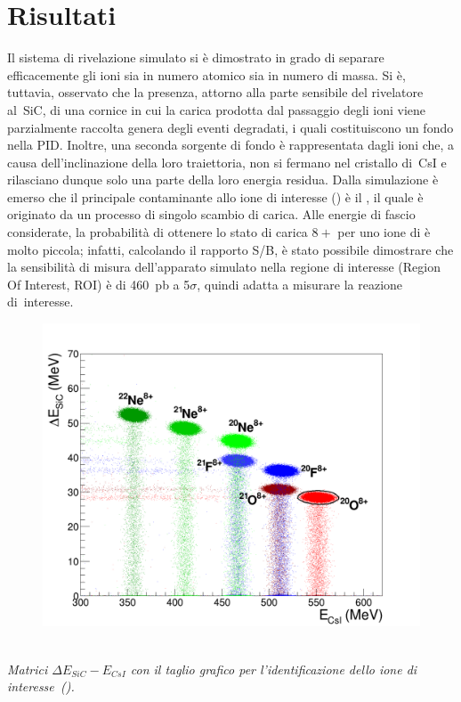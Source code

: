\documentclass[10pt,foldmark,notumble]{leaflet}
\begin{document}
\section{Risultati}

Il sistema di rivelazione simulato si è dimostrato in grado di separare efficacemente gli ioni sia in numero atomico sia in numero di massa.
Si è, tuttavia, osservato che la presenza, attorno alla parte sensibile del rivelatore al~SiC, di una cornice in cui la carica prodotta dal passaggio degli ioni viene parzialmente raccolta genera degli eventi degradati, i quali costituiscono un fondo nella PID.
Inoltre, una seconda sorgente di fondo è rappresentata dagli ioni che, a causa dell'inclinazione della loro traiettoria, non si fermano nel cristallo di~CsI e rilasciano dunque solo una parte della loro energia residua.
Dalla simulazione è emerso che il principale contaminante allo ione di interesse () è il , il quale è originato da un processo di singolo scambio di carica.
Alle energie di fascio considerate, la probabilità di ottenere lo stato di carica $8+$ per uno ione di  è molto piccola; infatti, calcolando il rapporto S/B, è stato possibile dimostrare che la sensibilità di misura dell'apparato simulato nella regione di interesse (Region Of Interest, ROI) è di 460~pb a 5$\sigma$, quindi adatta a misurare la reazione di~interesse.
\begin{figure} [!h]
	\centering
	\includegraphics[width=0.75\columnwidth, keepaspectratio]{Grafici_Tesi2/PIDnew/deltaE_Ecsi_quadrata_taglio_menoeventi2.png}
\end{figure}\\
\textit{ Matrici $\Delta E_{SiC} - E_{CsI}$ con il taglio grafico per l'identificazione dello ione di interesse~().}\\
\end{document}
